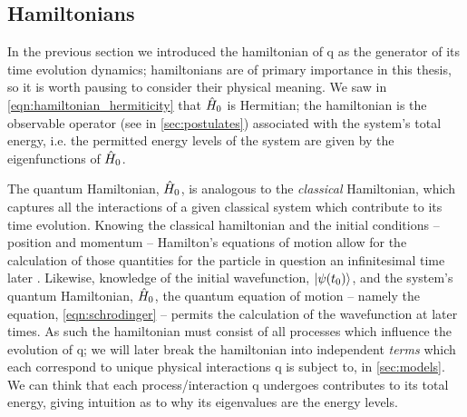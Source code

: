 \subsection{Hamiltonians}\label{sec:hamiltonians}
In the previous section we introduced the \gls{hamiltonian} of \gls{q} as the generator of its 
    time evolution dynamics;
    \glspl{hamiltonian} are of primary importance in this thesis, so it is worth pausing to consider their physical meaning. 
We saw in \cref{eqn:hamiltonian_hermiticity} that $\hat{H}_0$ is Hermitian;
    the \gls{hamiltonian} is the observable operator (see  in \cref{sec:postulates}) 
    associated with the system's total energy, 
    i.e. the permitted energy levels of the system are given by the eigenfunctions of $\hat{H}_0$. 
\par 

The quantum Hamiltonian, $\hat{H}_0$, is analogous to the \emph{classical} Hamiltonian, 
    which captures all the interactions of a given classical system which contribute to its time evolution.
Knowing the classical \gls{hamiltonian} and the initial conditions -- position and momentum -- 
    Hamilton's equations of motion allow for the calculation of those quantities for the particle 
    in question an infinitesimal time later \cite{susskind2014classical}.    
Likewise, knowledge of the initial wavefunction, $\ket{\psi(t_0)}$, and the system's quantum Hamiltonian, $\hat{H}_0$, 
    the quantum equation of motion -- namely the \schrodinger equation, \cref{eqn:schrodinger} -- 
    permits the calculation of the wavefunction at later times.
As such the \gls{hamiltonian} must consist of all processes which influence the evolution of \gls{q};
    we will later break the \gls{hamiltonian} into independent \emph{terms} which each correspond to unique physical interactions
    \gls{q} is subject to, in \cref{sec:models}. 
We can think that each process/interaction \gls{q} undergoes contributes to its total energy,
    giving intuition as to why its eigenvalues are the energy levels. 
\par 

